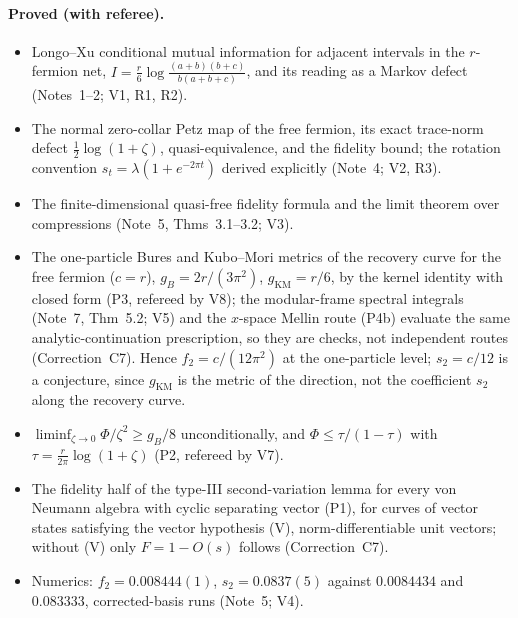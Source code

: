 \documentclass[11pt]{article}
\theoremstyle{accent}
\theoremstyle{definition}
\begin{document}
\paragraph{Proved (with referee).}
\begin{itemize}[leftmargin=1.6em,itemsep=1pt]
\item Longo--Xu conditional mutual information for adjacent intervals in the \(r\)-fermion net, \(I=\frac r6\log\frac{(a+b)(b+c)}{b(a+b+c)}\), and its reading as a Markov defect (Notes~1--2; V1, R1, R2).
\item The normal zero-collar Petz map of the free fermion, its exact trace-norm defect \(\frac12\log(1+\zeta)\), quasi-equivalence, and the fidelity bound; the rotation convention \(s_t=\lambda(1+e^{-2\pi t})\) derived explicitly (Note~4; V2, R3).
\item The finite-dimensional quasi-free fidelity formula and the limit theorem over compressions (Note~5, Thms~3.1--3.2; V3).
\item The one-particle Bures and Kubo--Mori metrics of the recovery curve for the free fermion (\(c=r\)), \(g_B=2r/(3\pi^2)\), \(g_{\mathrm{KM}}=r/6\), by the kernel identity with closed form (P3, refereed by V8); the modular-frame spectral integrals (Note~7, Thm~5.2; V5) and the \(x\)-space Mellin route (P4b) evaluate the same analytic-continuation prescription, so they are checks, not independent routes (Correction~C7).  Hence \(f_2=c/(12\pi^2)\) at the one-particle level; \(s_2=c/12\) is a conjecture, since \(g_{\mathrm{KM}}\) is the metric of the direction, not the coefficient \(s_2\) along the recovery curve.
\item \(\liminf_{\zeta\to0}\Phi/\zeta^2\ge g_B/8\) unconditionally, and \(\Phi\le\tau/(1-\tau)\) with \(\tau=\frac r{2\pi}\log(1+\zeta)\) (P2, refereed by V7).
\item The fidelity half of the type-III second-variation lemma for every von Neumann algebra with cyclic separating vector (P1), for curves of vector states satisfying the vector hypothesis (V), norm-differentiable unit vectors; without (V) only \(F=1-O(s)\) follows (Correction~C7).
\item Numerics: \(f_2=0.008444(1)\), \(s_2=0.0837(5)\) against \(0.0084434\) and \(0.083333\), corrected-basis runs (Note~5; V4).
\end{itemize}
\end{document}
